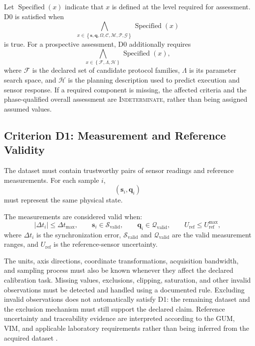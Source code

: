 \documentclass[11pt,a4paper]{article}
\begin{document}
Let $\operatorname{Specified}(x)$ indicate that $x$ is defined at the level
required for assessment. D0 is satisfied when
\begin{equation}
    \bigwedge_{
        x\in
        \left\{
            \mathbf{s},
            \mathbf{q},
            \Omega,
            \mathcal{C},
            \mathcal{M},
            \mathcal{P},
            \mathcal{G}
        \right\}
    }
    \operatorname{Specified}(x)
\end{equation}
is true. For a prospective assessment, D0 additionally requires
\begin{equation}
    \bigwedge_{
        x\in
        \left\{
            \mathcal{F},
            \Lambda,
            \mathcal{H}
        \right\}
    }
    \operatorname{Specified}(x),
\end{equation}
where $\mathcal{F}$ is the declared set of candidate protocol families,
$\Lambda$ is its parameter search space, and $\mathcal{H}$ is the planning
description used to predict execution and sensor response. If a required
component is missing, the affected criteria and the phase-qualified overall
assessment are \textsc{Indeterminate}, rather than being assigned assumed
values.

\subsection{Criterion D1: Measurement and Reference Validity}

The dataset must contain trustworthy pairs of sensor readings and reference
measurements. For each sample $i$,
\begin{equation}
    \left(\mathbf{s}_i,\mathbf{q}_i\right)
\end{equation}
must represent the same physical state.

The measurements are considered valid when:
\begin{equation}
    |\Delta t_i| \leq \Delta t_{\max},
    \qquad
    \mathbf{s}_i \in \mathcal{S}_{\mathrm{valid}},
    \qquad
    \mathbf{q}_i \in \mathcal{Q}_{\mathrm{valid}},
    \qquad
    U_{\mathrm{ref}} \leq U_{\mathrm{ref}}^{\max},
\end{equation}
where $\Delta t_i$ is the synchronization error,
$\mathcal{S}_{\mathrm{valid}}$ and $\mathcal{Q}_{\mathrm{valid}}$ are the valid
measurement ranges, and $U_{\mathrm{ref}}$ is the reference-sensor uncertainty.

The units, axis directions, coordinate transformations, acquisition bandwidth,
and sampling process must also be known whenever they affect the declared
calibration task. Missing values, exclusions, clipping, saturation, and other
invalid observations must be detected and handled using a documented rule.
Excluding invalid observations does not automatically satisfy D1: the
remaining dataset and the exclusion mechanism must still support the declared
claim. Reference uncertainty and traceability evidence are interpreted
according to the GUM, VIM, and applicable laboratory requirements rather than
being inferred from the acquired dataset \cite{jcgm100,jcgm200,iso17025}.
\end{document}
